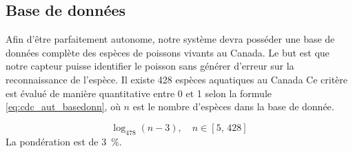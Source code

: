 

\subsection{Base de données}
\label{s:cdc_aut_basedonn}

Afin d’être parfaitement autonome, notre système devra posséder une base de données complète des espèces de poissons vivants au Canada.
Le but est que notre capteur puisse identifier le poisson sans générer d’erreur sur la reconnaissance de l’espèce.
Il existe 428 espèces aquatiques au Canada \cite{peches_oceans_canada_liste_poissons}
Ce critère est évalué de manière quantitative entre 0 et 1 selon la formule \ref{eq:cdc_aut_basedonn}, où $n$ est le nombre d'espèces dans la base de donnée.

\begin{equation}
	\label{eq:cdc_aut_basedonn}
	\log_{478}(n-3),\quad n \in [5,\,428]
\end{equation}
La pondération est de 3~\%.